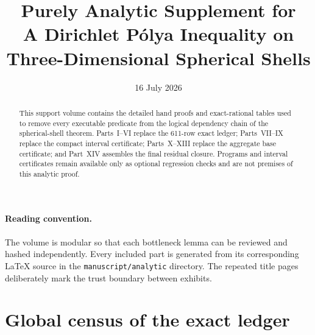 \documentclass[11pt]{article}
\title{Purely Analytic Supplement for\\
A Dirichlet P\'olya Inequality on\\
Three-Dimensional Spherical Shells}
\author{}
\date{16 July 2026}
\begin{document}
\maketitle

\begin{abstract}
This support volume contains the detailed hand proofs and exact-rational
tables used to remove every executable predicate from the logical dependency
chain of the spherical-shell theorem. Parts~I--VI replace the 611-row exact
ledger; Parts~VII--IX replace the compact interval certificate; Parts~X--XIII
replace the aggregate base certificate; and Part~XIV assembles the final
residual closure. Programs and interval certificates remain available only
as optional regression checks and are not premises of this analytic proof.
\end{abstract}

\paragraph{Reading convention.}
The volume is modular so that each bottleneck lemma can be reviewed and
hashed independently. Every included part is generated from its corresponding
LaTeX source in the \texttt{manuscript/analytic} directory. The repeated title
pages deliberately mark the trust boundary between exhibits.

\section*{Global census of the exact ledger}
\end{document}
